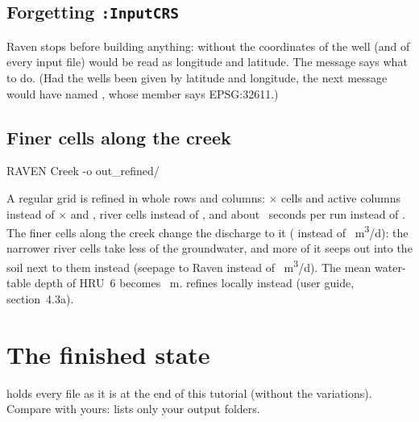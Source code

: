 \subsection{Forgetting \texttt{:InputCRS}}\label{sec:t2crs}
Raven stops before building anything: without  the coordinates of the well (and of every input file) would
be read as longitude and latitude. The message says what to do. (Had the wells been given by latitude and longitude, the
next message would have named , whose  member says EPSG:32611.)

\subsection{Finer cells along the creek}
\begin{shell}
$ $RAVEN Creek -o out_refined/
\end{shell}
A regular grid is refined in whole rows and columns: $\times$ cells and 
active columns instead of $\times$ and ,  river cells instead of
, and about ~seconds per run instead of . The finer cells along the creek change
the discharge to it ( instead of ~m\textsuperscript{3}/d): the narrower river cells take
less of the groundwater, and more of it seeps out into the soil next to them instead (seepage to Raven 
instead of ~m\textsuperscript{3}/d). The mean water-table depth of HRU~6 becomes ~m.  refines locally instead (user guide, section~4.3a).

\section{The finished state}
 holds every file as it is at the end of this tutorial (without the variations). Compare
with yours:  lists only your output folders.

